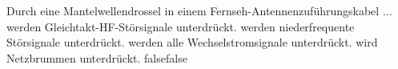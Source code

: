     {Durch eine Mantelwellendrossel in einem Fernseh-Antennenzuführungskabel ...}
    {werden Gleichtakt-HF-Störsignale unterdrückt.}
    {werden niederfrequente Störsignale unterdrückt.}
    {werden alle Wechselstromsignale unterdrückt.}
    {wird Netzbrummen unterdrückt.}
    {false}{false}
